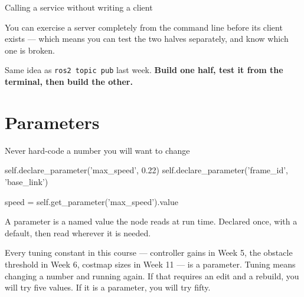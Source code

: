 \documentclass[aspectratio=169]{beamer}
\begin{document}
\begin{frame}[fragile]{Calling a service without writing a client}

  \vspace{0.4em}
  \small
  You can exercise a server completely from the command line before its client exists ---
  which means you can test the two halves separately, and know which one is broken.

  \vspace{0.3em}
  \footnotesize
  Same idea as \texttt{ros2 topic pub} last week. \textbf{Build one half, test it from the
  terminal, then build the other.}
\end{frame}

\section{Parameters}

\begin{frame}[fragile]{Never hard-code a number you will want to change}
  \begin{pycodes}
self.declare_parameter('max_speed', 0.22)
self.declare_parameter('frame_id', 'base_link')

speed = self.get_parameter('max_speed').value
  \end{pycodes}

  \vspace{0.5em}
  \small
  A parameter is a named value the node reads at run time. Declared once, with a default,
  then read wherever it is needed.

  \vspace{0.5em}
  \begin{underhood}
    \footnotesize
    Every tuning constant in this course --- controller gains in Week 5, the obstacle threshold
    in Week 6, costmap sizes in Week 11 --- is a parameter. Tuning means changing a number and
    running again. If that requires an edit and a rebuild, you will try five values. If it is a
    parameter, you will try fifty.
  \end{underhood}
\end{frame}
\end{document}
